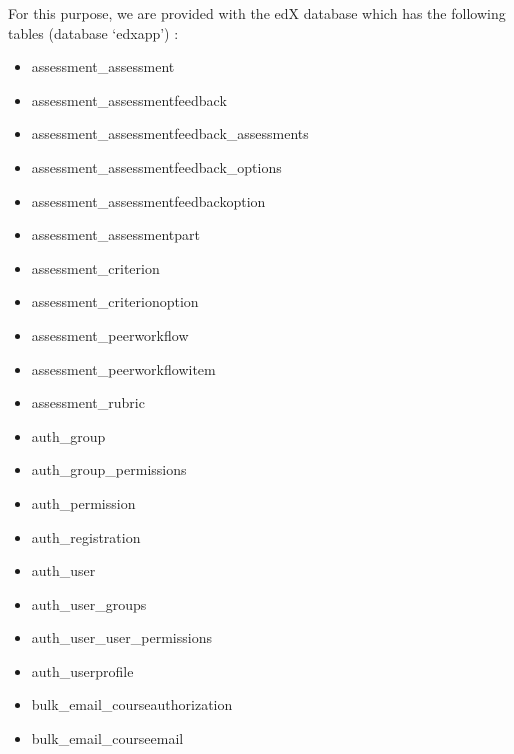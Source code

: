 \documentclass[a4paper,12pt,oneside]{sphinxmanual}
\begin{document}
For this purpose, we are provided with the edX database which has the following tables (database `edxapp') :
\begin{itemize}
\item {} 
assessment\_assessment

\item {} 
assessment\_assessmentfeedback

\item {} 
assessment\_assessmentfeedback\_assessments

\item {} 
assessment\_assessmentfeedback\_options

\item {} 
assessment\_assessmentfeedbackoption

\item {} 
assessment\_assessmentpart

\item {} 
assessment\_criterion

\item {} 
assessment\_criterionoption

\item {} 
assessment\_peerworkflow

\item {} 
assessment\_peerworkflowitem

\item {} 
assessment\_rubric

\item {} 
auth\_group

\item {} 
auth\_group\_permissions

\item {} 
auth\_permission

\item {} 
auth\_registration

\item {} 
auth\_user

\item {} 
auth\_user\_groups

\item {} 
auth\_user\_user\_permissions

\item {} 
auth\_userprofile

\item {} 
bulk\_email\_courseauthorization

\item {} 
bulk\_email\_courseemail


\end{itemize}
\end{document}
